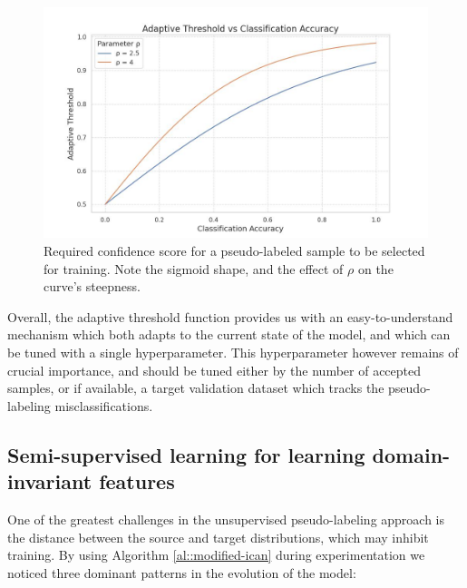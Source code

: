 \documentclass[12pt, a4paper]{article}
\begin{document}
	\begin{figure}
		\centering
		\includegraphics[width=12cm]{"adaptive_threshold.jpeg"}
		\caption{Required confidence score for a pseudo-labeled sample to be selected for training. Note the sigmoid shape, and the effect of $\rho$ on the curve's steepness.}
		\label{fig::adaptive_comparison}
	\end{figure}
	
	Overall, the adaptive threshold function provides us with an easy-to-understand mechanism which both adapts to the current state of the model, and which can be tuned with a single hyperparameter. This hyperparameter however remains of crucial importance, and should be tuned either by the number of accepted samples, or if available, a target validation dataset which tracks the pseudo-labeling misclassifications.
	
	
	\subsection{Semi-supervised learning for learning domain-invariant features}
	
	One of the greatest challenges in the unsupervised pseudo-labeling approach is the distance between the source and target distributions, which may inhibit training. By using Algorithm \ref{al::modified-ican} during experimentation we noticed three dominant patterns in the evolution of the model:
	
\end{document}
